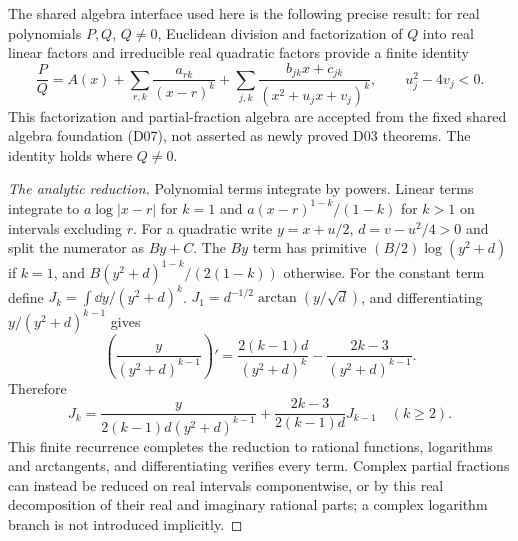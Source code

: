 \begin{construction}
The shared algebra interface used here is the following precise result:
for real polynomials $P,Q$, $Q\ne0$, Euclidean division and factorization
of $Q$ into real linear factors and irreducible real quadratic factors
provide a finite identity
\[\frac P Q=A(x)+\sum_{r,k}\frac{a_{rk}}{(x-r)^k}
+\sum_{j,k}\frac{b_{jk}x+c_{jk}}{(x^2+u_jx+v_j)^k},
\qquad u_j^2-4v_j<0.
\]
This factorization and partial-fraction algebra are accepted from the
fixed shared algebra foundation (D07), not asserted as newly proved D03
theorems. The identity holds where $Q\ne0$.
\end{construction}
\begin{proof}[The analytic reduction]
Polynomial terms integrate by powers. Linear terms integrate to
$a\log|x-r|$ for $k=1$ and
$a(x-r)^{1-k}/(1-k)$ for $k>1$ on intervals excluding $r$.
For a quadratic write $y=x+u/2$, $d=v-u^2/4>0$ and split the numerator
as $By+C$. The $By$ term has primitive
$(B/2)\log(y^2+d)$ if $k=1$, and
$B(y^2+d)^{1-k}/(2(1-k))$ otherwise.
For the constant term define $J_k=\int\dd y/(y^2+d)^k$.
$J_1=d^{-1/2}\arctan(y/\sqrt d)$, and differentiating
$y/(y^2+d)^{k-1}$ gives
\[\left(\frac{y}{(y^2+d)^{k-1}}\right)'
=\frac{2(k-1)d}{(y^2+d)^k}-\frac{2k-3}{(y^2+d)^{k-1}}.
\]
Therefore
\[J_k=\frac{y}{2(k-1)d(y^2+d)^{k-1}}
+\frac{2k-3}{2(k-1)d}J_{k-1}\quad(k\ge2).
\]
This finite recurrence completes the reduction to rational functions,
logarithms and arctangents, and differentiating verifies every term.
Complex partial fractions can instead be reduced on real intervals
componentwise, or by this real decomposition of their real and imaginary
rational parts; a complex logarithm branch is not introduced implicitly.
\end{proof}

